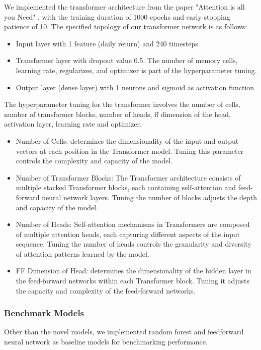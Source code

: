 \documentclass{article}
\begin{document}
We implemented the transformer architecture from the paper "Attention is all you Need" \citep{vaswani2017attention}, with the training duration of 1000 epochs and early stopping patience of 10. The specified topology of our transformer network is as follows:

\begin{itemize}
  \item Input layer with 1 feature (daily return) and 240 timesteps
  \item Transformer layer with dropout value 0.5. The number of memory cells, learning rate, regularizes, and optimizer is part of the hyperparameter tuning. 
  \item Output layer (dense layer) with 1 neurons and sigmoid as activation function
\end{itemize}

The hyperparameter tuning for the transformer involves the number of cells, number of transformer blocks, number of heads, ff dimension of the head, activation layer, learning rate and optimizer. 
\begin{itemize}
  \item Number of Cells: determines the dimensionality of the input and output vectors at each position in the Transformer model. Tuning this parameter controls the complexity and capacity of the model.
  \item Number of Transformer Blocks: The Transformer architecture consists of multiple stacked Transformer blocks, each containing self-attention and feed-forward neural network layers. Tuning the number of blocks adjusts the depth and capacity of the model. 
  \item Number of Heads: Self-attention mechanisms in Transformers are composed of multiple attention heads, each capturing different aspects of the input sequence. Tuning the number of heads controls the granularity and diversity of attention patterns learned by the model.
  \item FF Dimension of Head: determines the dimensionality of the hidden layer in the feed-forward networks within each Transformer block. Tuning it adjusts the capacity and complexity of the feed-forward networks.
\end{itemize}


\subsubsection{Benchmark Models}
Other than the novel models, we implemented random forest and feedforward neural network as baseline models for benchmarking performance. 
\end{document}
